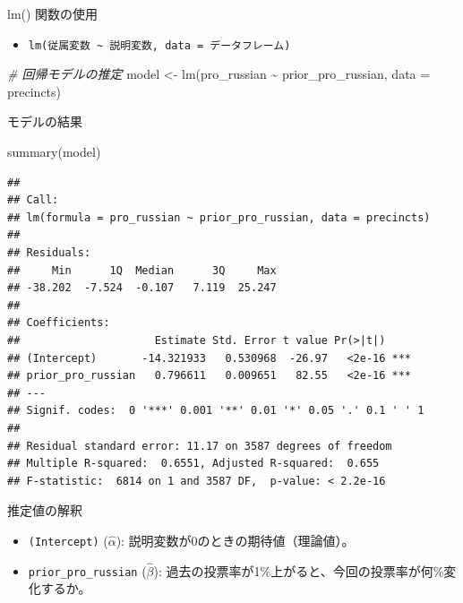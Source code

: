 \documentclass[
  ignorenonframetext,
]{beamer}
\newenvironment{Shaded}{\begin{snugshade}}{\end{snugshade}}
\newcommand{\AttributeTok}[1]{\textcolor[rgb]{0.77,0.63,0.00}{#1}}
\newcommand{\CommentTok}[1]{\textcolor[rgb]{0.56,0.35,0.01}{\textit{#1}}}
\newcommand{\FunctionTok}[1]{\textcolor[rgb]{0.00,0.00,0.00}{#1}}
\newcommand{\NormalTok}[1]{#1}
\newcommand{\OtherTok}[1]{\textcolor[rgb]{0.56,0.35,0.01}{#1}}
\newcommand{\SpecialCharTok}[1]{\textcolor[rgb]{0.00,0.00,0.00}{#1}}
\providecommand{\tightlist}{%
  \setlength{\itemsep}{0pt}\setlength{\parskip}{0pt}}
\begin{document}
\begin{frame}[fragile]{lm() 関数の使用}
\protect\hypertarget{lm-ux95a2ux6570ux306eux4f7fux7528}{}
\begin{itemize}
\tightlist
\item
  \texttt{lm(従属変数\ \textasciitilde{}\ 説明変数,\ data\ =\ データフレーム)}
\end{itemize}

\footnotesize

\begin{Shaded}
\begin{Highlighting}[]
\CommentTok{\# 回帰モデルの推定}
\NormalTok{model }\OtherTok{\textless{}{-}} \FunctionTok{lm}\NormalTok{(pro\_russian }\SpecialCharTok{\textasciitilde{}}\NormalTok{ prior\_pro\_russian, }\AttributeTok{data =}\NormalTok{ precincts)}
\end{Highlighting}
\end{Shaded}

\normalsize
\end{frame}

\begin{frame}[fragile]{モデルの結果}
\protect\hypertarget{ux30e2ux30c7ux30ebux306eux7d50ux679c}{}
\scriptsize

\begin{Shaded}
\begin{Highlighting}[]
\FunctionTok{summary}\NormalTok{(model)}
\end{Highlighting}
\end{Shaded}

\begin{verbatim}
## 
## Call:
## lm(formula = pro_russian ~ prior_pro_russian, data = precincts)
## 
## Residuals:
##     Min      1Q  Median      3Q     Max 
## -38.202  -7.524  -0.107   7.119  25.247 
## 
## Coefficients:
##                     Estimate Std. Error t value Pr(>|t|)    
## (Intercept)       -14.321933   0.530968  -26.97   <2e-16 ***
## prior_pro_russian   0.796611   0.009651   82.55   <2e-16 ***
## ---
## Signif. codes:  0 '***' 0.001 '**' 0.01 '*' 0.05 '.' 0.1 ' ' 1
## 
## Residual standard error: 11.17 on 3587 degrees of freedom
## Multiple R-squared:  0.6551, Adjusted R-squared:  0.655 
## F-statistic:  6814 on 1 and 3587 DF,  p-value: < 2.2e-16
\end{verbatim}

\normalsize
\end{frame}

\begin{frame}[fragile]{推定値の解釈}
\protect\hypertarget{ux63a8ux5b9aux5024ux306eux89e3ux91c8}{}
\begin{itemize}
\tightlist
\item
  \texttt{(Intercept)} (\(\hat{\alpha}\)):
  説明変数が0のときの期待値（理論値）。
\item
  \texttt{prior\_pro\_russian} (\(\hat{\beta}\)):
  過去の投票率が1\%上がると、今回の投票率が何\%変化するか。
\end{itemize}
\end{frame}
\end{document}
